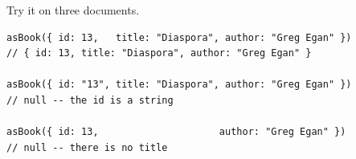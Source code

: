 \documentclass[11pt,a4paper]{article}
\begin{document}
\newpage

Try it on three documents.

\begin{lstlisting}[language=TS]
asBook({ id: 13,   title: "Diaspora", author: "Greg Egan" })
// { id: 13, title: "Diaspora", author: "Greg Egan" }

asBook({ id: "13", title: "Diaspora", author: "Greg Egan" })
// null -- the id is a string

asBook({ id: 13,                     author: "Greg Egan" })
// null -- there is no title
\end{lstlisting}
\end{document}
